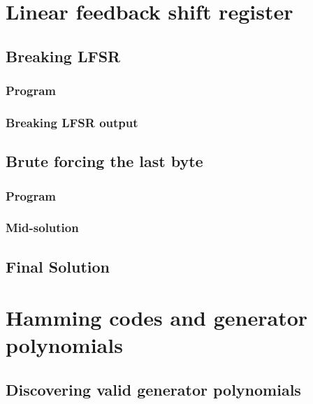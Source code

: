 \documentclass[pdftex, 12pt, a4paper]{article}
\begin{document}
\pagebreak
\appendices
\section{Linear feedback shift register}
\subsection{Breaking LFSR}
\subsubsection{Program}\label{break-lfsr}

\pagebreak

\subsubsection{Breaking LFSR output}\label{break-lfsr-out}
\pagebreak

\subsection{Brute forcing the last byte}
\subsubsection{Program}\label{last-byte}

\pagebreak

\subsubsection{Mid-solution}\label{last-byte-out}

\subsection{Final Solution}\label{q1-solution}
\pagebreak

\section{Hamming codes and generator polynomials}
\subsection{Discovering valid generator polynomials}\label{hammgen}

\pagebreak
\end{document}
